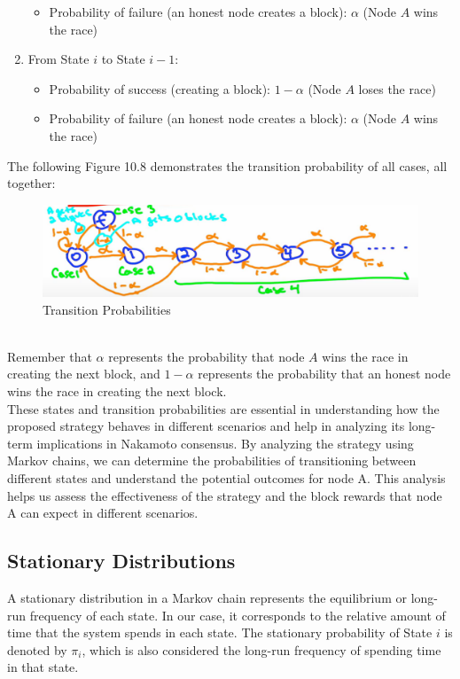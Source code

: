 \begin{enumerate}
\begin{itemize}
        \item Probability of failure (an honest node creates a block): $\alpha$ (Node $A$ wins the race)
    \end{itemize}
    \item From State $i$ to State $i-1$:
    \begin{itemize}
        \item Probability of success (creating a block): $1 - \alpha$ (Node $A$ loses the race)
        \item Probability of failure (an honest node creates a block): $\alpha$ (Node $A$ wins the race)
    \end{itemize}
\end{enumerate}

The following Figure 10.8 demonstrates the transition probability of all cases, all together:\\
\begin{figure}[h]
    \centering
    \includegraphics[scale = 0.5]{figures/f48.png}
    \caption{Transition Probabilities}
    \label{fig:mesh1}
\end{figure}\\

Remember that $\alpha$ represents the probability that node $A$ wins the race in creating the next block, and $1 - \alpha$ represents the probability that an honest node wins the race in creating the next block.\\

These states and transition probabilities are essential in understanding how the proposed strategy behaves in different scenarios and help in analyzing its long-term implications in Nakamoto consensus. By analyzing the strategy using Markov chains, we can determine the probabilities of transitioning between different states and understand the potential outcomes for node A. This analysis helps us assess the effectiveness of the strategy and the block rewards that node A can expect in different scenarios.

\subsection{Stationary Distributions}
A stationary distribution in a Markov chain represents the equilibrium or long-run frequency of each state. In our case, it corresponds to the relative amount of time that the system spends in each state. The stationary probability of State $i$ is denoted by $\pi_i$, which is also considered the long-run frequency of spending time in that state.


